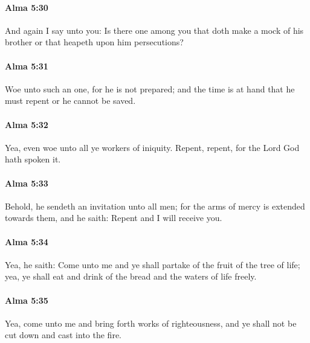 		\paragraph{Alma 5:30} %
			\label{ALMA-5-30}

			And again I say unto you:
			Is there one among you that doth make a mock of his brother
			or that heapeth upon him persecutions?

		\paragraph{Alma 5:31} %
			\label{ALMA-5-31}

			Woe unto such an one,
			for he is not prepared;
			and the time is at hand that he must repent or he cannot be saved.

		\paragraph{Alma 5:32} %
			\label{ALMA-5-32}

			Yea, even woe unto all ye workers of iniquity.
			Repent, repent, for the Lord God hath spoken it.

		\paragraph{Alma 5:33} %
			\label{ALMA-5-33}

			Behold, he sendeth an invitation unto all men;
			for the arms of mercy is extended towards them,
			and he saith:
			Repent and I will receive you.

		\paragraph{Alma 5:34} %
			\label{ALMA-5-34}

			Yea, he saith:
			Come unto me and ye shall partake of the fruit of the tree of life;
			yea, ye shall eat and drink of the bread and the waters of life freely.

		\paragraph{Alma 5:35} %
			\label{ALMA-5-35}

			Yea, come unto me and bring forth works of righteousness,
			and ye shall not be cut down and cast into the fire.

